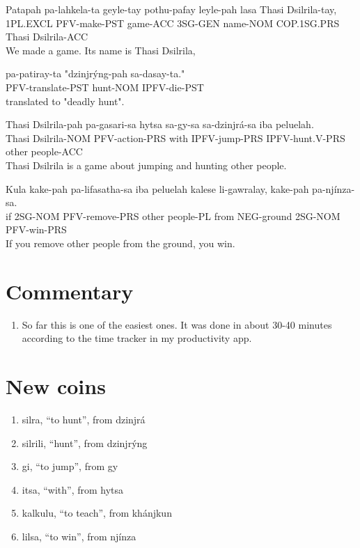 \documentclass{thiguka}
\begin{document}
\begin{exe}
\ex{} \gll{}Patapah  pa-lahkela-ta geyle-tay pothu-pafay leyle-pah lasa        Thasi Dsilrila-tay,\\
            1PL.EXCL PFV-make-PST  game-ACC  3SG-GEN     name-NOM  COP.1SG.PRS Thasi Dsilrila-ACC\\
      \glt{}We made a game. Its name is Thasi Dsilrila,
\end{exe}

\begin{exe}
\ex{} \gll{}pa-patiray-ta     "dzinjrýng-pah sa-dasay-ta."\\
            PFV-translate-PST  hunt-NOM      IPFV-die-PST\\
      \glt{}translated to "deadly hunt".
\end{exe}

\begin{exe}
\ex{} \gll{}Thasi Dsilrila-pah pa-gasari-sa   hytsa sa-gy-sa      sa-dzinjrá-sa   iba   peluelah.\\
            Thasi Dsilrila-NOM PFV-action-PRS with  IPFV-jump-PRS IPFV-hunt.V-PRS other people-ACC\\
      \glt{}Thasi Dsilrila is a game about jumping and hunting other people.
\end{exe}

\begin{exe}
\ex{} \gll{}Kula kake-pah pa-lifasatha-sa iba   peluelah  kalese li-gawralay, kake-pah pa-njínza-sa.\\
            if   2SG-NOM  PFV-remove-PRS  other people-PL from   NEG-ground   2SG-NOM  PFV-win-PRS\\
      \glt{}If you remove other people from the ground, you win.
\end{exe}

\section{Commentary}
\begin{enumerate}
    \item So far this is one of the easiest ones. It was done in about 30-40 minutes according to the time tracker in my productivity app.
\end{enumerate}

\newpage

\section{New coins}
\begin{enumerate}
    \item silra, ``to hunt'', from dzinjrá
    \item silrili, ``hunt'', from dzinjrýng
    \item gi, ``to jump'', from gy
    \item itsa, ``with'', from hytsa
    \item kalkulu, ``to teach'', from khánjkun
    \item lilsa, ``to win'', from njínza
\end{enumerate}
\end{document}
